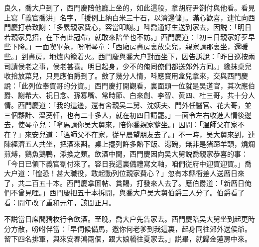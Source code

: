 良久，喬大户到了，西門慶陪他廳上坐的，如此這般，拿胡府尹劄付與他看。看見上寫「義官喬洪」名字，「援例上納白米三十石，以濟邊儲」。滿心歡喜，連忙向西門慶打恭致謝：「多累親家費心，容當叩謝。」呌喬通好生送到家去，因説：「明日若親家見招，在下有此冠帶，就敢來陪坐也不妨。」西門慶道：「初三日親家好歹早些下降。」一面喫畢茶，吩咐琴童：「西廂房書房裏放桌兒，親家請那裏坐，還暖些。」到書房，地爐内籠着火。西門慶與喬大户對面坐下，因告訴說：「昨日巡按兩司請侯老之事，侯老甚喜。明日起身，少不的俺同僚們都送郊外方囘。」纔抹桌兒收拾放菜兒，只見應伯爵到了。斂了幾分人情，呌應寳用盒兒拿來，交與西門慶說：「此列位奉賀哥的分資。」西門慶打開觀看，裏面頭一位就是吴道官，其次應伯爵、謝希大、祝日念、孫寡嘴、常時節、白來創、李智、黄四、杜三哥，共十分人情。西門慶道：「我的這邊，還有舍親吴二舅、沈姨夫、門外任醫官、花大哥，並三個夥計、溫葵軒，也有二十多人，就在初四日請罷。」一面令左右收進人情後邊去，使琴童兒：「拿馬請你吴大舅來，陪你喬親家爹坐。」因問：「溫師父在家不在？」來安兒道：「溫師父不在家，従早晨望朋友去了。」不一時，吴大舅來到，連陳經濟五人共坐，把酒來斟。桌上擺列許多熱下飯、湯碗，無非是猪蹄羊頭，燒爛煎煿，鷄魚鵝鴨，添換之類。飲酒中間，西門慶因向吴大舅説喬親家恭喜的事：「今日已領下義官劄付來了。容日我這裏備禮寫文軸，咱們従府中迎賀迎賀。」喬大户道：「惶恐！甚大職役，敢起動列位親家費心？」忽有本縣衙差人送曆日來了，共二百五十本。西門慶拿囬帖、賞賜，打發來人去了。應伯爵道：「新曆日俺們不曾見哩。」西門慶把五十本拆開，與喬大户吴大舅伯爵三人分了。伯爵看了看：開年改了重和元年，該閏正月。

不説當日席間猜枚行令飲酒。至晚，喬大户先告家去。西門慶陪吴大舅坐到起更時分方散，吩咐伴當：「早伺候備馬，邀你何老爹到我這裏，起身同往郊外送侯爺。留下四名排軍，與來安春鴻兩個，跟大娘轎往夏家去。」説畢，就歸金蓮房中來。

